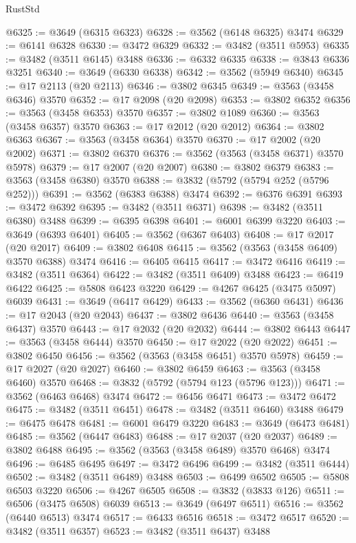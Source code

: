 \begin{lexlean}{RustStd}
\begin{coremodule}
{\begin{coremodule}
{{{{{{{{{{{{{{{{{{{{{{{{{{{{{{{{{{{{{{{{{{{{{@6325 := @3649 (@6315 @6323)
@6328 := @3562 (@6148 @6325) @3474
@6329 := @6141 @6328
@6330 := @3472 @6329
@6332 := @3482 (@3511 @5953)
@6335 := @3482 (@3511 @6145) @3488
@6336 := @6332 @6335
@6338 := @3843 @6336 @3251
@6340 := @3649 (@6330 @6338)
@6342 := @3562 (@5949 @6340)
@6345 := @17 @2113 (@20 @2113)
@6346 := @3802 @6345
@6349 := @3563 (@3458 @6346) @3570
@6352 := @17 @2098 (@20 @2098)
@6353 := @3802 @6352
@6356 := @3563 (@3458 @6353) @3570
@6357 := @3802 @1089
@6360 := @3563 (@3458 @6357) @3570
@6363 := @17 @2012 (@20 @2012)
@6364 := @3802 @6363
@6367 := @3563 (@3458 @6364) @3570
@6370 := @17 @2002 (@20 @2002)
@6371 := @3802 @6370
@6376 := @3562 (@3563 (@3458 @6371) @3570 @5978)
@6379 := @17 @2007 (@20 @2007)
@6380 := @3802 @6379
@6383 := @3563 (@3458 @6380) @3570
@6388 := @3832 (@5792 (@5794 @252 (@5796 @252)))
@6391 := @3562 (@6383 @6388) @3474
@6392 := @6376 @6391
@6393 := @3472 @6392
@6395 := @3482 (@3511 @6371)
@6398 := @3482 (@3511 @6380) @3488
@6399 := @6395 @6398
@6401 := @6001 @6399 @3220
@6403 := @3649 (@6393 @6401)
@6405 := @3562 (@6367 @6403)
@6408 := @17 @2017 (@20 @2017)
@6409 := @3802 @6408
@6415 := @3562 (@3563 (@3458 @6409) @3570 @6388) @3474
@6416 := @6405 @6415
@6417 := @3472 @6416
@6419 := @3482 (@3511 @6364)
@6422 := @3482 (@3511 @6409) @3488
@6423 := @6419 @6422
@6425 := @5808 @6423 @3220
@6429 := @4267 @6425 (@3475 @5097) @6039
@6431 := @3649 (@6417 @6429)
@6433 := @3562 (@6360 @6431)
@6436 := @17 @2043 (@20 @2043)
@6437 := @3802 @6436
@6440 := @3563 (@3458 @6437) @3570
@6443 := @17 @2032 (@20 @2032)
@6444 := @3802 @6443
@6447 := @3563 (@3458 @6444) @3570
@6450 := @17 @2022 (@20 @2022)
@6451 := @3802 @6450
@6456 := @3562 (@3563 (@3458 @6451) @3570 @5978)
@6459 := @17 @2027 (@20 @2027)
@6460 := @3802 @6459
@6463 := @3563 (@3458 @6460) @3570
@6468 := @3832 (@5792 (@5794 @123 (@5796 @123)))
@6471 := @3562 (@6463 @6468) @3474
@6472 := @6456 @6471
@6473 := @3472 @6472
@6475 := @3482 (@3511 @6451)
@6478 := @3482 (@3511 @6460) @3488
@6479 := @6475 @6478
@6481 := @6001 @6479 @3220
@6483 := @3649 (@6473 @6481)
@6485 := @3562 (@6447 @6483)
@6488 := @17 @2037 (@20 @2037)
@6489 := @3802 @6488
@6495 := @3562 (@3563 (@3458 @6489) @3570 @6468) @3474
@6496 := @6485 @6495
@6497 := @3472 @6496
@6499 := @3482 (@3511 @6444)
@6502 := @3482 (@3511 @6489) @3488
@6503 := @6499 @6502
@6505 := @5808 @6503 @3220
@6506 := @4267 @6505
@6508 := @3832 (@3833 @126)
@6511 := @6506 (@3475 @6508) @6039
@6513 := @3649 (@6497 @6511)
@6516 := @3562 (@6440 @6513) @3474
@6517 := @6433 @6516
@6518 := @3472 @6517
@6520 := @3482 (@3511 @6357)
@6523 := @3482 (@3511 @6437) @3488
}}}}}}}}}}}}}}}}}}}}}}}}}}}}}}}}}}}}}}}}}}}}}
\end{coremodule}}
\end{coremodule}
\end{lexlean}
